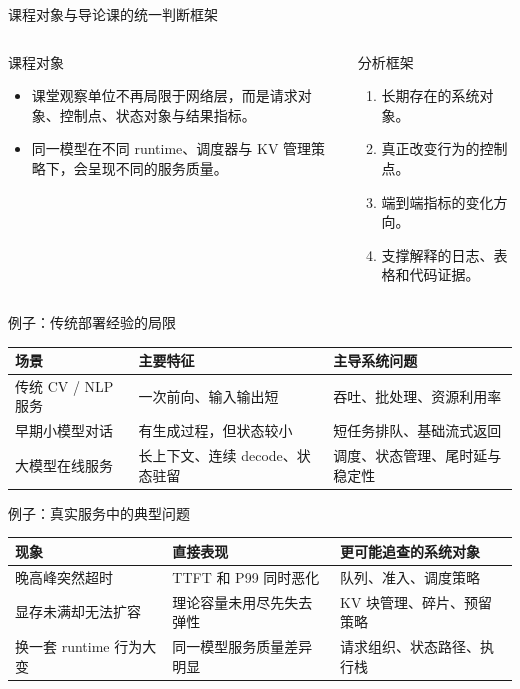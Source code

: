 \begin{frame}{课程对象与导论课的统一判断框架}
  \begin{columns}[T,totalwidth=\textwidth]
    \begin{block}{课程对象}
      \begin{itemize}
        \item 课堂观察单位不再局限于网络层，而是请求对象、控制点、状态对象与结果指标。
        \item 同一模型在不同 runtime、调度器与 KV 管理策略下，会呈现不同的服务质量。
      \end{itemize}
    \end{block}
    \begin{block}{分析框架}
      \begin{enumerate}
        \item 长期存在的系统对象。
        \item 真正改变行为的控制点。
        \item 端到端指标的变化方向。
        \item 支撑解释的日志、表格和代码证据。
      \end{enumerate}
    \end{block}
  \end{columns}
\end{frame}

\begin{frame}{例子：传统部署经验的局限}
  \begin{tabular}{p{}p{}p{}}
    \toprule
    场景 & 主要特征 & 主导系统问题 \\
    \midrule
    传统 CV / NLP 服务 & 一次前向、输入输出短 & 吞吐、批处理、资源利用率 \\
    早期小模型对话 & 有生成过程，但状态较小 & 短任务排队、基础流式返回 \\
    大模型在线服务 & 长上下文、连续 decode、状态驻留 & 调度、状态管理、尾时延与稳定性 \\
    \bottomrule
  \end{tabular}
\end{frame}

\begin{frame}{例子：真实服务中的典型问题}
  \begin{tabular}{p{}p{}p{}}
    \toprule
    现象 & 直接表现 & 更可能追查的系统对象 \\
    \midrule
    晚高峰突然超时 & TTFT 和 P99 同时恶化 & 队列、准入、调度策略 \\
    显存未满却无法扩容 & 理论容量未用尽先失去弹性 & KV 块管理、碎片、预留策略 \\
    换一套 runtime 行为大变 & 同一模型服务质量差异明显 & 请求组织、状态路径、执行栈 \\
    \bottomrule
  \end{tabular}
\end{frame}

